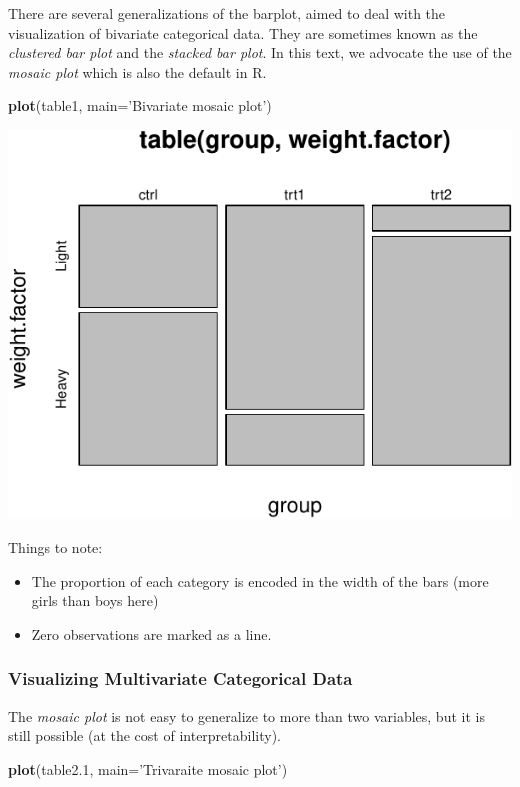 \documentclass[]{book}
\newenvironment{Shaded}{\begin{snugshade}}{\end{snugshade}}
\newcommand{\KeywordTok}[1]{\textcolor[rgb]{0.13,0.29,0.53}{\textbf{#1}}}
\newcommand{\DataTypeTok}[1]{\textcolor[rgb]{0.13,0.29,0.53}{#1}}
\newcommand{\DecValTok}[1]{\textcolor[rgb]{0.00,0.00,0.81}{#1}}
\newcommand{\StringTok}[1]{\textcolor[rgb]{0.31,0.60,0.02}{#1}}
\newcommand{\NormalTok}[1]{#1}
\providecommand{\tightlist}{%
  \setlength{\itemsep}{0pt}\setlength{\parskip}{0pt}}
\theoremstyle{definition}
\theoremstyle{definition}
\theoremstyle{definition}
\theoremstyle{remark}
\begin{document}
There are several generalizations of the barplot, aimed to deal with the
visualization of bivariate categorical data. They are sometimes known as
the \emph{clustered bar plot} and the \emph{stacked bar plot}. In this
text, we advocate the use of the \emph{mosaic plot} which is also the
default in R.

\begin{Shaded}
\begin{Highlighting}[]
\KeywordTok{plot}\NormalTok{(table1, }\DataTypeTok{main=}\StringTok{'Bivariate mosaic plot'}\NormalTok{)}
\end{Highlighting}
\end{Shaded}

\includegraphics[width=0.5\linewidth]{Rcourse_files/figure-latex/unnamed-chunk-129-1}

Things to note:

\begin{itemize}
\tightlist
\item
  The proportion of each category is encoded in the width of the bars
  (more girls than boys here)
\item
  Zero observations are marked as a line.
\end{itemize}

\subsubsection{Visualizing Multivariate Categorical
Data}\label{visualizing-multivariate-categorical-data}

The \emph{mosaic plot} is not easy to generalize to more than two
variables, but it is still possible (at the cost of interpretability).

\begin{Shaded}
\begin{Highlighting}[]
\KeywordTok{plot}\NormalTok{(table2.}\DecValTok{1}\NormalTok{, }\DataTypeTok{main=}\StringTok{'Trivaraite mosaic plot'}\NormalTok{)}
\end{Highlighting}
\end{Shaded}
\end{document}
